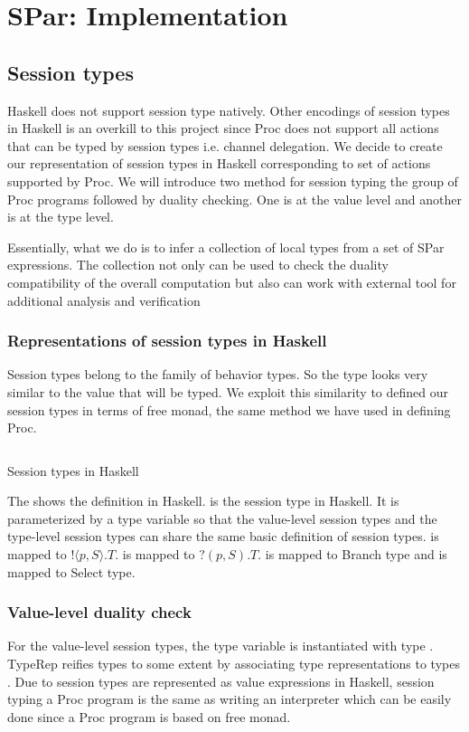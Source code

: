 \chapter{SPar: Implementation} \label{chap:impl}
\section{Session types} \label{impl:sec:session}
Haskell does not support session type natively. Other encodings of session types in Haskell is an overkill to this project since Proc does not support all actions that can be typed by session types i.e. channel delegation. We decide to create our representation of session types in Haskell corresponding to set of actions supported by Proc. We will introduce two method for session typing the group of Proc programs followed by duality checking. One is at the value level and another is at the type level.

Essentially, what we do is to infer a collection of local types from a set of SPar expressions. The collection not only can be used to check the duality compatibility of the overall computation but also can work with external tool \cite{langeVerifyingAsynchronousInteractions2019} for additional analysis and verification
\subsection{Representations of session types in Haskell}
Session types belong to the family of behavior types. So the type looks very similar to the value that will be typed. We exploit this similarity to defined our session types in terms of free monad, the same method we have used in defining Proc.
\begin{listing}[ht]
    \inputminted{Haskell}{impl/type.hs}
    \caption{Session types in Haskell}
    \label{impl:code:type}
\end{listing}

The  shows the definition in Haskell.  is the session type in Haskell. It is parameterized by a type variable  so that the value-level session types and the type-level session types can share the same basic definition of session types.  is mapped to $! \langle p, S \rangle . T$.  is mapped to $?(p, S).T$.  is mapped to Branch type and  is mapped to Select type.
\subsection{Value-level duality check}
For the value-level session types, the type variable  is instantiated with type . TypeRep reifies types to some extent by associating type representations to types \cite{DataTypeable}. Due to session types are represented as value expressions in Haskell, session typing a Proc program is the same as writing an interpreter which can be easily done since a Proc program is based on free monad. 

